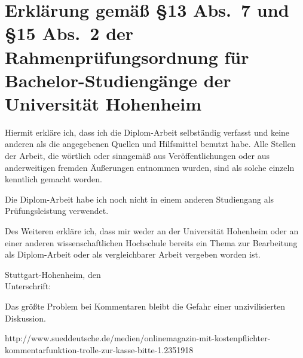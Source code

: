 \newpage


\section*{Erklärung gemäß §13 Abs.~7 und §15 Abs.~2  der Rahmenprüfungsordnung für Bachelor-Studiengänge der
Universität Hohenheim}

Hiermit erkläre ich, dass ich die Diplom-Arbeit selbständig verfasst und keine anderen als die
angegebenen Quellen und Hilfsmittel benutzt habe. Alle Stellen der Arbeit, die wörtlich oder
sinngemäß aus Veröffentlichungen oder aus anderweitigen fremden Äußerungen entnommen wurden, sind
als solche einzeln kenntlich gemacht worden.

Die Diplom-Arbeit habe ich noch nicht in einem anderen Studiengang als Prüfungsleistung verwendet.

Des Weiteren erkläre ich, dass mir weder an der Universität Hohenheim oder an einer anderen
wissenschaftlichen Hochschule bereits ein Thema zur Bearbeitung als Diplom-Arbeit oder als
vergleichbarer Arbeit vergeben worden ist.


\begin{tabbing}
Stuttgart-Hohenheim, den \qquad\= \underline{\hspace{9cm}} \\[2em]
Unterschrift: \> \underline{\hspace{9cm}}
\end{tabbing}




Das größte Problem bei Kommentaren bleibt die Gefahr einer unzivilisierten Diskussion.

http://www.sueddeutsche.de/medien/onlinemagazin-mit-kostenpflichter-kommentarfunktion-trolle-zur-kasse-bitte-1.2351918
